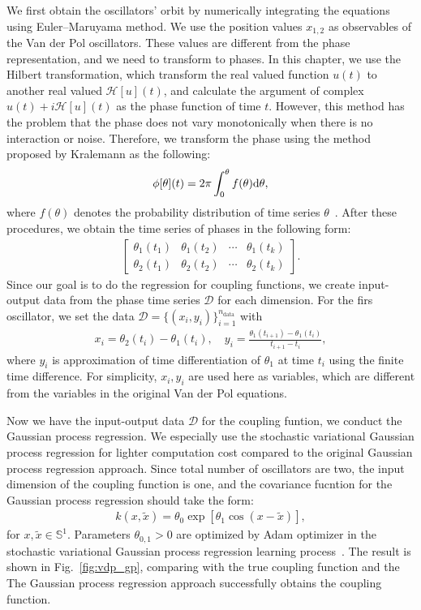 We first obtain the oscillators' orbit by numerically integrating the equations using Euler--Maruyama method.
We use the position values $x_{1,2}$ as observables of the Van der Pol oscillators.
These values are different from the phase representation, and we need to transform to phases.
In this chapter, we use the Hilbert transformation, which transform the real valued function $u(t)$ to another real valued $\mathcal{H}[u](t)$, and calculate the argument of complex $u(t)+i\mathcal{H}[u](t)$ as the phase function of time $t$.
However, this method has the problem that the phase does not vary monotonically when there is no interaction or noise.
Therefore, we transform the phase using the method proposed by Kralemann as the following:
\begin{align}
    \phi[\theta](t)=2\pi\int_{0}^{\theta}f(\theta)\mathrm{d}\theta,
\end{align}
where $f(\theta)$ denotes the probability distribution of time series $\theta$~\cite{kralemann2011,kralemann2008,kralemann2007}.
After these procedures, we obtain the time series of phases in the following form:
\begin{align}
\begin{bmatrix}
    \theta_{1}(t_{1}) & \theta_{1}(t_{2}) & \cdots & \theta_{1}(t_{k})\\
    \theta_{2}(t_{1}) & \theta_{2}(t_{2}) & \cdots & \theta_{2}(t_{k})
\end{bmatrix}.
\end{align}
Since our goal is to do the regression for coupling functions, we create input-output data from the phase time series $\mathcal{D}$ for each dimension.
For the firs oscillator, we set the data $\mathcal{D}=\{(x_{i},y_{i})\}_{i=1}^{n_{\mathrm{data}}}$ with
\begin{align}
    x_{i}=\theta_{2}(t_{i})-\theta_{1}(t_{i}),\quad y_{i}=\frac{\theta_{1}(t_{i+1})-\theta_{1}(t_{i})}{t_{i+1}-t_{i}},
\end{align}
where $y_{i}$ is approximation of time differentiation of $\theta_{1}$ at time $t_{i}$ using the finite time difference. For simplicity, $x_{i},y_{i}$ are used here as variables, which are different from the variables in the original Van der Pol equations.

Now we have the input-output data $\mathcal{D}$ for the coupling funtion, we conduct the Gaussian process regression.
We especially use the stochastic variational Gaussian process regression for lighter computation cost compared to the original Gaussian process regression approach.
Since total number of oscillators are two, the input dimension of the coupling function is one, and the covariance fucntion for the Gaussian process regression should take the form:
\begin{align}
    k(x,\tilde{x})=\theta_{0}\exp[\theta_{1}\cos(x-\tilde{x})],
\end{align}
for $x,\tilde{x}\in\mathbb{S}^{1}$.
Parameters $\theta_{0,1}>0$ are optimized by Adam optimizer in the stochastic variational Gaussian process regression learning process~\cite{titsias2009,kingma2014}.
The result is shown in Fig.~\ref{fig:vdp_gp}, comparing with the true coupling function and the 
The Gaussian process regression approach successfully obtains the coupling function.

